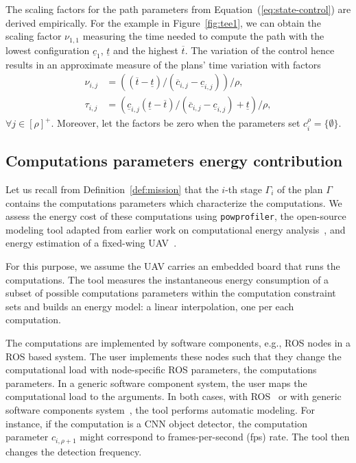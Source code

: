 \documentclass[letterpaper,10pt,conference]{ieeeconf}
\newcommand{\stt}[1]{{\small\tt #1}} %
\newcommand{\powprof}{\stt{powprofiler}}
\theoremstyle{definition}
\begin{document}
The scaling factors for the path parameters from Equation~(\ref{eq:state-control}) are derived empirically. For the example in Figure~\ref{fig:tee1}, we can obtain the scaling factor $\nu_{1,1}$ measuring the time needed to compute the path with the lowest configuration $\underline{c}_1$, $\underline{t}$ and the highest $\overline{t}$. The variation of the control hence results in an approximate measure of the plans' time variation with factors
\begin{equation}\label{eq:scale-traj}\begin{split}
  \nu_{i,j}&=\left((\overline{t}-\underline{t})/(\overline{c}_{i,j}-\underline{c}_{i,j})\right)/\rho,\\
  \tau_{i,j}&=\left(\underline{c}_{i,j}(\underline{t}-\overline{t})/(\overline{c}_{i,j}-\underline{c}_{i,j})+\underline{t}\right)/\rho,
\end{split}\end{equation} 
$\forall j\in[\rho]^+$. Moreover, let the factors be zero when the parameters set $c_i^\rho=\{\emptyset\}$.

\subsection{Computations parameters energy contribution}
\label{sec:computations-model}

Let us recall from Definition~\ref{def:mission} that the $i$-th stage $\Gamma_i$ of the plan $\Gamma$ contains the computations parameters which characterize the computations. We assess the energy cost of these computations using \powprof{}, the open-source modeling tool adapted from earlier work on computational energy analysis~\cite{seewald2019coarse, seewald2019component}, and energy estimation of a fixed-wing UAV~\cite{seewald2020mechanical}. 

For this purpose, we assume the UAV carries an embedded board that runs the computations. The tool measures the instantaneous energy consumption of a subset of possible computations parameters within the computation constraint sets and builds an energy model: a linear interpolation, one per each computation. 

The computations are implemented by software components, e.g., ROS nodes in a ROS based system. The user implements these nodes such that they change the computational load with node-specific ROS parameters, the computations parameters. In a generic software component system, the user maps the computational load to the arguments. In both cases, with ROS~\cite{zamanakos2020energy} or with generic software components system~\cite{seewald2019component}, the tool performs automatic modeling. For instance, if the computation is a CNN object detector, the computation parameter $c_{i,\rho+1}$ might correspond to frames-per-second (fps) rate. The tool then changes the detection frequency.
\end{document}
